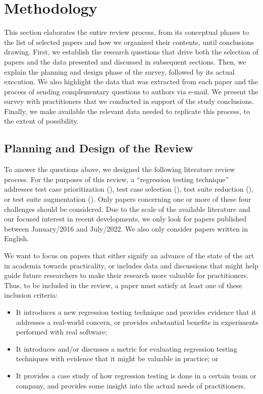 \section{Methodology}\label{sec:lit_methodology}

This section elaborates the entire review process, from its conceptual phases to the list of selected papers and how we organized their contents, until conclusions drawing.
First, we establish the research questions that drive both the selection of papers and the data presented and discussed in subsequent sections.
Then, we explain the planning and design phase of the survey, followed by its actual execution.
We also highlight the data that was extracted from each paper and the process of sending complementary questions to authors via e-mail. We present the survey with practitioners that we conducted in support of the study conclusions.
Finally, we make available the relevant data needed to replicate this process, to the extent of possibility.

\subsection{Planning and Design of the Review}

To answer the questions above, we designed the following literature review process.
For the purposes of this review, a ``regression testing technique'' addresses test case prioritization (\tcp), test case selection (\tcs), test suite reduction (\tsr), or test suite augmentation (\tsa).
Only papers concerning one or more of these four challenges should be considered.
Due to the scale of the available literature and our focused interest in recent developments, we only look for papers published between January/2016 and July/2022.
We also only consider papers written in English.

We want to focus on papers that either signify an advance of the state of the art in academia towards practicality, or includes data and discussions that might help guide future researchers to make their research more valuable for practitioners.
Thus, to be included in the review, a paper must satisfy at least one of these inclusion criteria:
\begin{itemize}
    \item It introduces a new regression testing technique and provides evidence that it addresses a real-world concern, or provides substantial benefits in experiments performed with real software;
    \item It introduces and/or discusses a metric for evaluating regression testing techniques with evidence that it might be valuable in practice; or
    \item It provides a case study of how regression testing is done in a certain team or company, and provides some insight into the actual needs of practitioners.
\end{itemize}

